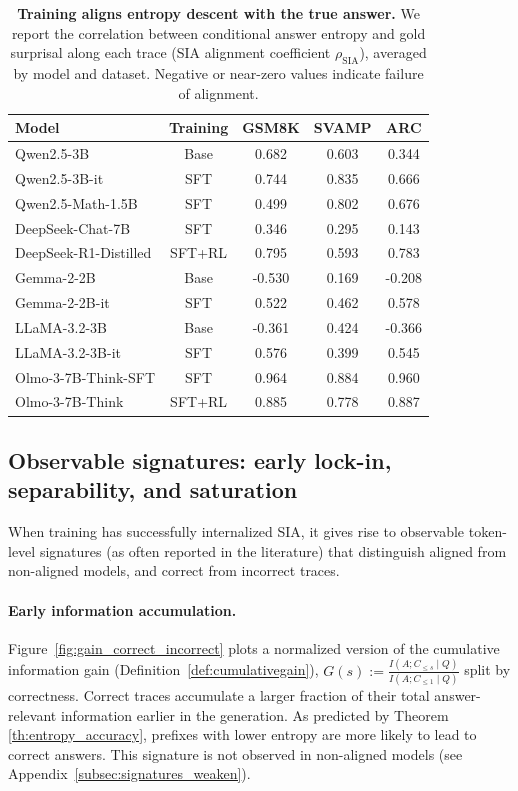 \documentclass{article}
\newcommand{\bad}[1]{{\color{failred} #1}}
\newcommand{\weak}[1]{{\color{weakorange} #1}}
\begin{document}
\begin{table}[hbtp!]
\caption{\textbf{Training aligns entropy descent with the true answer.}
We report the correlation between conditional answer entropy and gold surprisal along each trace
(SIA alignment coefficient $\rho_{\mathrm{SIA}}$), averaged by model and dataset.
\bad{Negative} or \weak{near-zero} values indicate failure of alignment.}
\centering
\small
\setlength{\tabcolsep}{4pt}
\begin{tabular}{lcccc}
\toprule
\textbf{Model} & \textbf{Training} &
\textbf{GSM8K} & \textbf{SVAMP} & \textbf{ARC} \\
\midrule
Qwen2.5-3B        & Base & 0.682 & 0.603 & 0.344 \\
Qwen2.5-3B-it     & SFT  & 0.744 & 0.835 & 0.666 \\
Qwen2.5-Math-1.5B & SFT  & 0.499 & 0.802 & 0.676 \\
DeepSeek-Chat-7B  & SFT  & 0.346 & 0.295 & 0.143 \\
DeepSeek-R1-Distilled & SFT+RL & 0.795 & 0.593 & 0.783 \\
Gemma-2-2B        & Base & \bad{-0.530} & 0.169 & \bad{-0.208} \\
Gemma-2-2B-it     & SFT  & 0.522 & 0.462 & 0.578 \\
LLaMA-3.2-3B      & Base & \bad{-0.361} & 0.424 & \bad{-0.366} \\
LLaMA-3.2-3B-it   & SFT  & 0.576 & 0.399 & 0.545 \\
Olmo-3-7B-Think-SFT & SFT & 0.964 & 0.884 & 0.960 \\
Olmo-3-7B-Think   & SFT+RL & 0.885 & 0.778 & 0.887 \\
\bottomrule
\end{tabular}
\label{tab:sia_alignment_by_dataset}
\end{table}

\subsection{Observable signatures: early lock-in, separability, and saturation}
\label{sec:signatures}

When training has successfully internalized SIA, it gives rise to observable token-level signatures (as often reported in the literature) that distinguish aligned from non-aligned models, and correct from incorrect traces.

\paragraph{Early information accumulation.}
Figure~\ref{fig:gain_correct_incorrect} plots a normalized version of the cumulative information gain (Definition~\ref{def:cumulativegain}),
\(
G(s):=\frac{I(A;C_{\le s}\mid Q)}{I(A;C_{\le 1}\mid Q)}
\)
split by correctness. Correct traces accumulate a larger fraction of their total answer-relevant information earlier in the generation. As predicted by Theorem~ \ref{th:entropy_accuracy}, prefixes with lower entropy are more likely to lead to correct answers. This signature is not observed in non-aligned models (see Appendix~\ref{subsec:signatures_weaken}).
\end{document}
